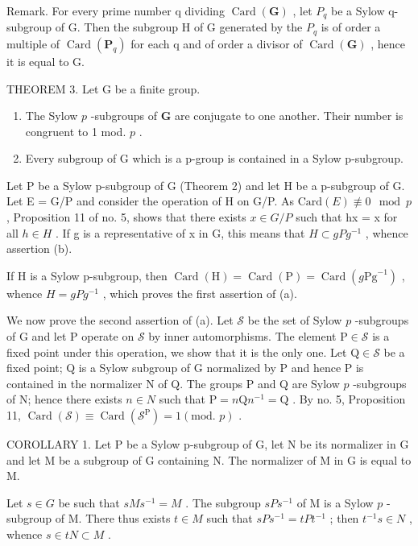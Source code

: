 Remark. For every prime number q dividing \(\operatorname{Card}(\mathbf{G})\) , let \(P_{q}\) be a Sylow q-subgroup of G. Then the subgroup H of G generated by the \(P_{q}\) is of order a multiple of \(\operatorname{Card}(\mathbf{P}_{q})\) for each q and of order a divisor of \(\operatorname{Card}(\mathbf{G})\) , hence it is equal to G.

THEOREM 3. Let G be a finite group.

\begin{enumerate}
\def\labelenumi{(\alph{enumi})}
\item
  The Sylow \(p\) -subgroups of \(\mathbf{G}\) are conjugate to one another. Their number is congruent to 1 mod. \(p\) .
\item
  Every subgroup of G which is a p-group is contained in a Sylow p-subgroup.
\end{enumerate}

Let P be a Sylow p-subgroup of G (Theorem 2) and let H be a p-subgroup of G. Let E = G/P and consider the operation of H on G/P. As \(\text{Card}(E) \not\equiv 0 \mod p\) , Proposition 11 of no. 5, shows that there exists \(x \in G/P\) such that hx = x for all \(h \in H\) . If g is a representative of x in G, this means that \(H \subset gPg^{-1}\) , whence assertion (b).

If H is a Sylow p-subgroup, then \(\operatorname{Card}(\mathrm{H}) = \operatorname{Card}(\mathrm{P}) = \operatorname{Card}(g\mathrm{Pg}^{-1})\) , whence \(H = gPg^{-1}\) , which proves the first assertion of (a).

We now prove the second assertion of (a). Let \(\mathcal{S}\) be the set of Sylow \(p\) -subgroups of G and let P operate on \(\mathcal{S}\) by inner automorphisms. The element \(\mathrm{P} \in \mathcal{S}\) is a fixed point under this operation, we show that it is the only one. Let \(\mathrm{Q} \in \mathcal{S}\) be a fixed point; Q is a Sylow subgroup of G normalized by P and hence P is contained in the normalizer N of Q. The groups P and Q are Sylow \(p\) -subgroups of N; hence there exists \(n \in N\) such that \(\mathrm{P} = n\mathrm{Q}n^{-1} = \mathrm{Q}\) . By no. 5, Proposition 11, \(\operatorname{Card}(\mathcal{S}) \equiv \operatorname{Card}(\mathcal{S}^{\mathrm{P}}) = 1 (\text{mod. } p)\) .

COROLLARY 1. Let P be a Sylow p-subgroup of G, let N be its normalizer in G and let M be a subgroup of G containing N. The normalizer of M in G is equal to M.

Let \(s \in G\) be such that \(sMs^{-1} = M\) . The subgroup \(sPs^{-1}\) of M is a Sylow \(p\) -subgroup of M. There thus exists \(t \in M\) such that \(sPs^{-1} = tPt^{-1}\) ; then \(t^{-1}s \in N\) , whence \(s \in tN \subset M\) .

